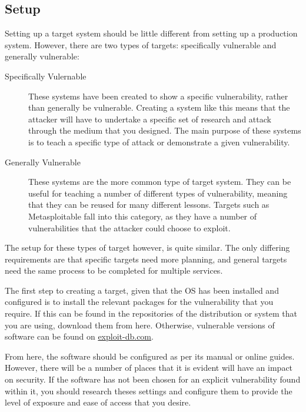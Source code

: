 		\subsection{Setup}
			Setting up a target system should be little different from setting up a production system. 
			However, there are two types of targets: specifically vulnerable and generally vulnerable:
			\begin{description}
				\item[Specifically Vulernable]
					These systems have been created to show a specific vulnerability, rather than generally be vulnerable. 
					Creating a system like this means that the attacker will have to undertake a specific set of research
					and attack through the medium that you designed. 
					The main purpose of these systems is to teach a specific type of attack or demonstrate a given vulnerability. 
				\item[Generally Vulnerable]
					These systems are the more common type of target system. 
					They can be useful for teaching a number of different types of vulnerability, meaning that they can be reused for many different lessons. 
					Targets such as Metasploitable fall into this category, as they have a number of vulnerabilities that the attacker could choose to exploit. 
			\end{description}

			The setup for these types of target however, is quite similar. 
			The only differing requirements are that specific targets need more planning, and general targets need the same process to be completed for multiple services. 

			The first step to creating a target, given that the OS has been installed and configured is to install the relevant packages for the vulnerability that you require. 
			If this can be found in the repositories of the distribution or system that you are using, download them from here. 
			Otherwise, vulnerable versions of software can be found on \href{https://www.exploit-db.com/remote/?order\_by=application&order=desc&pg=1}{exploit-db.com}.

			From here, the software should be configured as per its manual or online guides. 
			However, there will be a number of places that it is evident will have an impact on security. 
			If the software has not been chosen for an explicit vulnerability found within it, you should research theses settings and configure them to provide the level of exposure and ease of access that you desire. 

